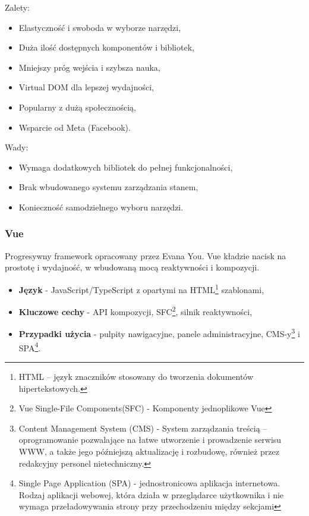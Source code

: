 Zalety:
\begin{itemize}
	\item Elastyczność i swoboda w wyborze narzędzi,
	\item Duża ilość dostępnych komponentów i bibliotek,
	\item Mniejszy próg wejścia i szybsza nauka,
	\item Virtual DOM dla lepszej wydajności,
	\item Popularny z dużą społecznością,
	\item Wsparcie od Meta (Facebook).
\end{itemize}

Wady:
\begin{itemize}
	\item Wymaga dodatkowych bibliotek do pełnej funkcjonalności,
	\item Brak wbudowanego systemu zarządzania stanem,
	\item Konieczność samodzielnego wyboru narzędzi.
\end{itemize}

\subsubsection{Vue}
Progresywny framework opracowany przez Evana You. Vue kładzie nacisk na prostotę i wydajność, w wbudowaną mocą reaktywności i kompozycji.

\begin{itemize}
	\item \textbf{Język} - JavaScript/TypeScript z opartymi na HTML\footnote{HTML – język znaczników stosowany do tworzenia dokumentów hipertekstowych.} szablonami,
	\item \textbf{Kluczowe cechy} - API kompozycji, SFC\footnote{Vue Single-File Components(SFC) - Komponenty jednoplikowe Vue}, silnik reaktywności,
	\item \textbf{Przypadki użycia} - pulpity nawigacyjne, panele administracyjne, CMS-y\footnote{Content Management System (CMS) - System zarządzania treścią – oprogramowanie pozwalające na łatwe utworzenie i prowadzenie serwisu WWW, a także jego późniejszą aktualizację i rozbudowę, również przez redakcyjny personel nietechniczny.} i SPA\footnote{Single Page Application (SPA) - jednostronicowa aplikacja internetowa. Rodzaj aplikacji webowej, która działa w przeglądarce użytkownika i nie wymaga przeładowywania strony przy przechodzeniu między sekcjami}.
\end{itemize}

